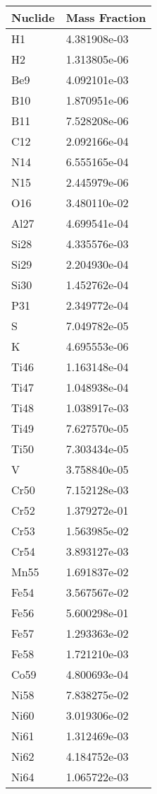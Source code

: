 \begin{centering}
\begin{longtable}[ht!]
\caption{Table showing the isotopic description of material UPDFW3}
\label{table:material_UPDFW3}
\end{longtable}\clearpage

\begin{longtable}[ht!]
{ p{} | p{} }
\hline
Nuclide & Mass Fraction\\
\hline
H1 & 4.381908e-03\\
H2 & 1.313805e-06\\
Be9 & 4.092101e-03\\
B10 & 1.870951e-06\\
B11 & 7.528208e-06\\
C12 & 2.092166e-04\\
N14 & 6.555165e-04\\
N15 & 2.445979e-06\\
O16 & 3.480110e-02\\
Al27 & 4.699541e-04\\
Si28 & 4.335576e-03\\
Si29 & 2.204930e-04\\
Si30 & 1.452762e-04\\
P31 & 2.349772e-04\\
S & 7.049782e-05\\
K & 4.695553e-06\\
Ti46 & 1.163148e-04\\
Ti47 & 1.048938e-04\\
Ti48 & 1.038917e-03\\
Ti49 & 7.627570e-05\\
Ti50 & 7.303434e-05\\
V & 3.758840e-05\\
Cr50 & 7.152128e-03\\
Cr52 & 1.379272e-01\\
Cr53 & 1.563985e-02\\
Cr54 & 3.893127e-03\\
Mn55 & 1.691837e-02\\
Fe54 & 3.567567e-02\\
Fe56 & 5.600298e-01\\
Fe57 & 1.293363e-02\\
Fe58 & 1.721210e-03\\
Co59 & 4.800693e-04\\
Ni58 & 7.838275e-02\\
Ni60 & 3.019306e-02\\
Ni61 & 1.312469e-03\\
Ni62 & 4.184752e-03\\
Ni64 & 1.065722e-03\\

\end{longtable}
\end{centering}
